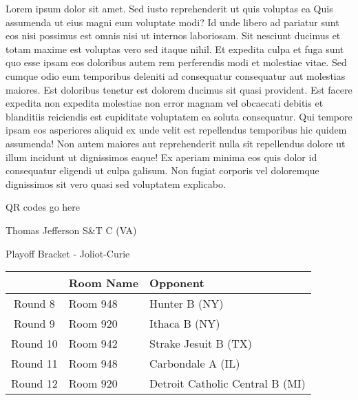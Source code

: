\documentclass{article}%
\begin{document}
\vspace*{8pt}%
\linebreak%
\newline%
\newline%
Lorem ipsum dolor sit amet. Sed iusto reprehenderit ut quis voluptas ea Quis assumenda ut eius magni eum voluptate modi? Id unde libero ad pariatur sunt eos nisi possimus est omnis nisi ut internos laboriosam. Sit nesciunt ducimus et totam maxime est voluptas vero sed itaque nihil. Et expedita culpa et fuga sunt quo esse ipsam eos doloribus autem rem perferendis modi et molestiae vitae.\newline%
\newline%
Sed cumque odio eum temporibus deleniti ad consequatur consequatur aut molestias maiores. Est doloribus tenetur est dolorem ducimus sit quasi provident. Est facere expedita non expedita molestiae non error magnam vel obcaecati debitis et blanditiis reiciendis est cupiditate voluptatem ea soluta consequatur. Qui tempore ipsam eos asperiores aliquid ex unde velit est repellendus temporibus hic quidem assumenda!\newline%
\newline%
Non autem maiores aut reprehenderit nulla sit repellendus dolore ut illum incidunt ut dignissimos eaque! Ex aperiam minima eos quis dolor id consequatur eligendi ut culpa galisum. Non fugiat corporis vel doloremque dignissimos sit vero quasi sed voluptatem explicabo.\newline%
\newline%
%
\vspace*{30pt}%
\begin{center}%
\begin{Huge}%
QR codes go here%
\end{Huge}%
\end{center}%
\newpage%
\begin{center}%
\begin{Huge}%
Thomas Jefferson S\&T C (VA)%
\end{Huge}%
\vspace*{8pt}%
\linebreak%
\begin{Large}%
Playoff Bracket {-} Joliot{-}Curie%
\end{Large}%
\end{center}%
%
\begin{tabularx}{\textwidth}{|c|Y|Y|}%
\hline%
&Room Name&Opponent\\%
\hline%
Round 8&Room 948&Hunter B (NY)\\%
Round 9&Room 920&Ithaca B (NY)\\%
Round 10&Room 942&Strake Jesuit B (TX)\\%
Round 11&Room 948&Carbondale A (IL)\\%
Round 12&Room 920&Detroit Catholic Central B (MI)\\%
\hline%
\end{tabularx}%
\end{document}
